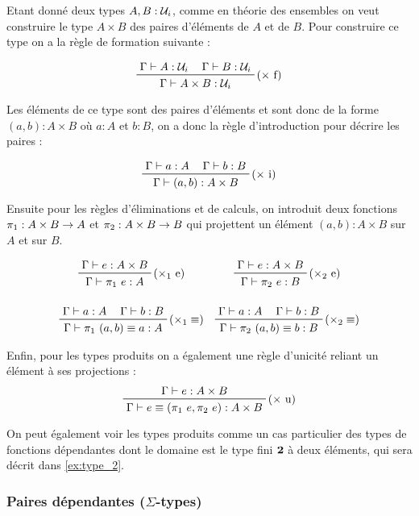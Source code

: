 \documentclass[../../rapport.tex]{subfiles}
\begin{document}
  Etant donné deux types $A, B : \mathcal U_i$, comme en théorie des ensembles on veut construire le type $A \times B$ des paires d'éléments
  de $A$ et de $B$. Pour construire ce type on a la règle de formation suivante :

  $$
  \prfinterspace=1.2em
  \prftree[r]{($\times$ f)}
  {\Gamma \vdash A : \U_i}
  {\Gamma \vdash B : \U_i}
  {\Gamma \vdash A \times B : \U_i}
  $$

  Les éléments de ce type sont des paires d'éléments et sont donc de la forme $(a, b) : A \times B$ où $a : A$ et $b : B$,
  on a donc la règle d'introduction pour décrire les paires :

  $$
  \prfinterspace=1.2em
  \prftree[r]{($\times$ i)}
  {\Gamma \vdash a : A}
  {\Gamma \vdash b : B}
  {\Gamma \vdash (a, b) : A \times B}
  $$

  Ensuite pour les règles d'éliminations et de calculs,
  on introduit deux fonctions $\pi_1 : A \times B \rightarrow A$ et $\pi_2 : A \times B \rightarrow B$
  qui projettent un élément $(a, b) : A \times B$ sur $A$ et sur $B$.

  $$
  \prfinterspace=1.2em
  \begin{array}{cc}
    \prftree[r]{($\times_1$ e)}
    {\Gamma \vdash e : A \times B}
    {\Gamma \vdash \pi_1\ e : A}
    &
    \prftree[r]{($\times_2$ e)}
    {\Gamma \vdash e : A \times B}
    {\Gamma \vdash \pi_2\ e : B}
    \vspace{1.5em}\\
    \prftree[r]{($\times_1 \equiv$)}
    {\Gamma \vdash a : A}
    {\Gamma \vdash b : B}
    {\Gamma \vdash \pi_1\ (a, b) \equiv a : A}
    &
    \prftree[r]{($\times_2 \equiv$)}
    {\Gamma \vdash a : A}
    {\Gamma \vdash b : B}
    {\Gamma \vdash \pi_2\ (a, b) \equiv b : B}
  \end{array}
  $$

  Enfin, pour les types produits on a également une règle d'unicité reliant un élément à ses projections :
  $$
  \prftree[r]{($\times$ u)}
  {\Gamma \vdash e : A \times B}
  {\Gamma \vdash e \equiv (\pi_1\ e, \pi_2\ e) : A \times B}
  $$

  On peut également voir les types produits comme un cas particulier des types de fonctions dépendantes dont le domaine
  est le type fini $\operatorname{\textbf{2}}$ à deux éléments, qui sera décrit dans \ref{ex:type_2}.

  \subsubsection{Paires dépendantes ($\Sigma$-types)}
\end{document}
